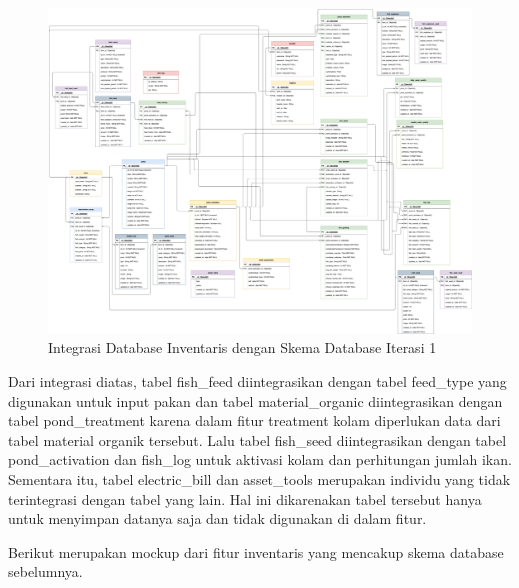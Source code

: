 \begin{spacing}{1.5}
	\begin{figure}[H]
		\centering
		\includegraphics[width=1.5\linewidth,height=1.00\linewidth, angle=270]{gambar/sprint1/sprint1_skema_database.png}
		\caption{Integrasi Database Inventaris dengan Skema Database Iterasi 1}
	\end{figure}

	Dari integrasi diatas, tabel fish\_feed diintegrasikan dengan tabel feed\_type yang digunakan untuk input pakan dan tabel material\_organic diintegrasikan dengan tabel pond\_treatment karena dalam fitur treatment kolam diperlukan data dari tabel material organik tersebut. Lalu tabel fish\_seed diintegrasikan dengan tabel pond\_activation dan fish\_log untuk aktivasi kolam dan perhitungan jumlah ikan. Sementara itu, tabel electric\_bill dan asset\_tools merupakan individu yang tidak terintegrasi dengan tabel yang lain. Hal ini dikarenakan tabel tersebut hanya untuk menyimpan datanya saja dan tidak digunakan di dalam fitur.
	
	Berikut merupakan mockup dari fitur inventaris yang mencakup skema database sebelumnya.


\end{spacing}
